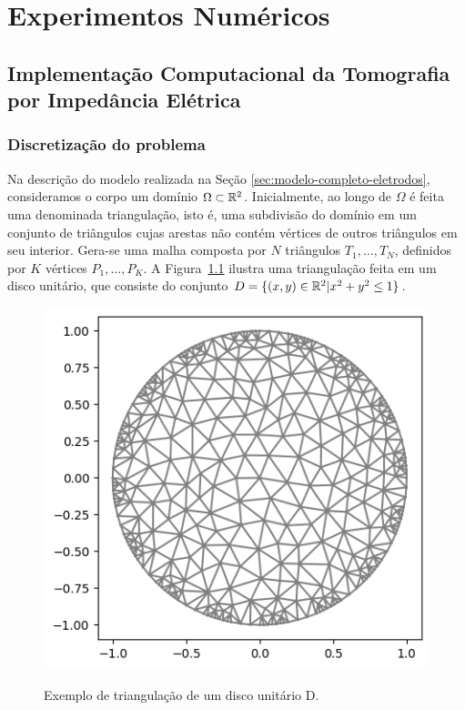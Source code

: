 \chapter{Experimentos Numéricos}

\section{Implementação Computacional da Tomografia por Impedância Elétrica}

\subsection{Discretização do problema}

Na descrição do modelo realizada na Seção \ref{sec:modelo-completo-eletrodos}, consideramos o corpo um domínio $\Omega \subset \mathbb{R}^2$. Inicialmente, ao longo de $\Omega$ é feita uma denominada triangulação, isto é, uma subdivisão do domínio em um conjunto de triângulos cujas arestas não contém vértices de outros triângulos em seu interior. Gera-se uma malha composta por $N$ triângulos $T_1,\dots,T_N$, definidos por $K$ vértices $P_1,\dots,P_K$. A Figura~\ref{fig:malha} ilustra uma triangulação feita em um disco unitário, que consiste do conjunto $D = \{(x,y) \in \mathbb{R}^2 | x^2+y^2 \leq 1\}$.

\begin{figure}[htbp]
    \centering
    \caption{Exemplo de triangulação de um disco unitário D.}
    \includegraphics[scale=0.75]{figuras/malha.png}
    \label{fig:malha}
\end{figure}

